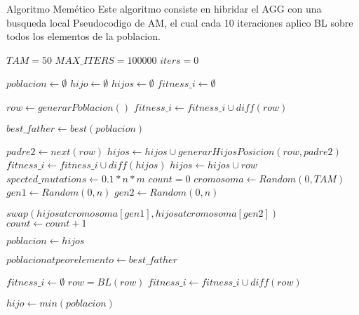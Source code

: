 Algoritmo Memético
Este algoritmo consiste en hibridar el AGG con una busqueda local
Pseudocodigo de AM, el cual cada 10 iteraciones aplico BL sobre todos los elementos de la poblacion.
\begin{algorithm}[H]
  \begin{algorithmic}[1]
      \State $TAM = 50$
      \State $MAX\_ITERS = 100000$
      \State $iters = 0$

      \State $poblacion \gets \emptyset$ 
      \State $hijo \gets \emptyset$ 
      \State $hijos \gets \emptyset$
      \State $fitness\_i \gets \emptyset$
      
        \State $row \gets generarPoblacion()$
        \State $fitness\_i \gets fitness\_i \cup diff(row)$
      \EndFor

        \State $best\_father \gets  best(poblacion)$ 

          \State $padre2 \gets next(row)$ 
            \State $hijos \gets hijos \cup generarHijosPosicion(row,padre2)$
            \State $fitness\_i \gets fitness\_i \cup diff(hijos)$  
          \Else
            \State $hijos \gets hijos \cup row$
          \EndIf
        \EndFor
        \State $spected\_mutations \gets 0.1*n*m$
        \State $count = 0$
          \State $cromosoma \gets Random(0,TAM)$ 
          \State $gen1 \gets Random(0,n)$
          \State $gen2 \gets Random(0,n)$ 

           
            \State $swap(hijos at cromosoma[gen1], hijos at cromosoma[gen2])$
          \EndIf
          \State $count \gets count +1 $
        \EndWhile

        \State $poblacion \gets hijos$ 

         
          \State $poblacion at peor elemento \gets best\_father$
        \EndIf

         
          \State $ fitness\_i \gets \emptyset$
            \State $row = BL(row)$ 
            \State $fitness\_i \gets fitness\_i \cup diff(row)$
          \EndFor
        \EndIf

      \EndWhile

      \State $hijo \gets min(poblacion)$
      
      \State {}
    \EndFunction
  \end{algorithmic}
\end{algorithm}

